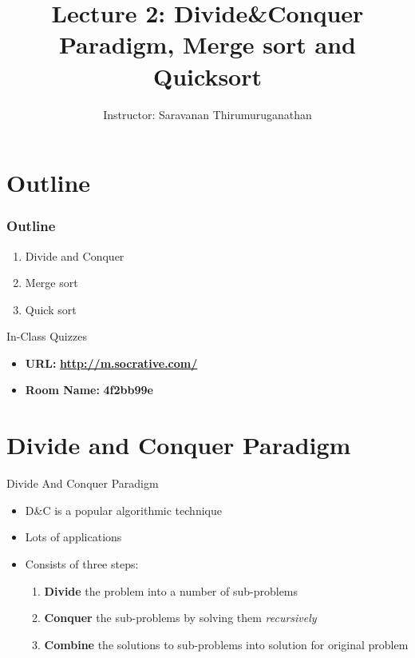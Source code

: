 \documentclass{beamer}
\title[Saravanan Thirumuruganathan] 
{Lecture 2: Divide\&Conquer Paradigm, Merge sort and Quicksort}
\author[CSE 5311] 
{Instructor: Saravanan Thirumuruganathan}
\date[]
\begin{document}
\begin{frame}
  \titlepage
\end{frame}


\section{Outline}

\begin{frame}
\frametitle {Outline}
\begin{enumerate}
\item Divide and Conquer
\item Merge sort
\item Quick sort
\end{enumerate}
\end{frame}

\begin{frame}{In-Class Quizzes}
\begin{itemize}
\item {\Large {\bf URL:}} {\LARGE \bf \url{http://m.socrative.com/}} 
\item {\Large {\bf Room Name:} {\LARGE \bf 4f2bb99e}}
\end{itemize}
\end{frame}

\section{Divide and Conquer Paradigm}

\begin{frame}{Divide And Conquer Paradigm}
\begin{itemize}
\item D\&C is a popular algorithmic technique
\item Lots of applications
\item Consists of three steps:
\begin{enumerate}
    \item {\bf Divide} the problem into a number of sub-problems
    \item {\bf Conquer} the sub-problems by solving them {\em recursively}
    \item {\bf Combine} the solutions to sub-problems into solution for original problem 
\end{enumerate}
\end{itemize}
\end{frame}
\end{document}
